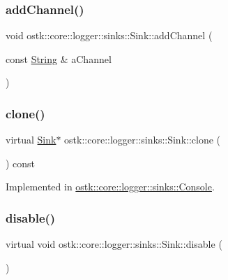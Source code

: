\subsubsection{\texorpdfstring{add\+Channel()}{addChannel()}}
{\footnotesize\ttfamily void ostk\+::core\+::logger\+::sinks\+::\+Sink\+::add\+Channel (\begin{DoxyParamCaption}\item[{const \hyperlink{classostk_1_1core_1_1types_1_1_string}{String} \&}]{a\+Channel }\end{DoxyParamCaption})}

\mbox{\label{classostk_1_1core_1_1logger_1_1sinks_1_1_sink_a0e6b41f9b4626b5229370f71bd27be32}} 
\subsubsection{\texorpdfstring{clone()}{clone()}}
{\footnotesize\ttfamily virtual \hyperlink{classostk_1_1core_1_1logger_1_1sinks_1_1_sink}{Sink}$\ast$ ostk\+::core\+::logger\+::sinks\+::\+Sink\+::clone (\begin{DoxyParamCaption}{ }\end{DoxyParamCaption}) const\hspace{0.3cm}{\ttfamily [pure virtual]}}



Implemented in \hyperlink{classostk_1_1core_1_1logger_1_1sinks_1_1_console_ab906fb3918a362c527489091e006d521}{ostk\+::core\+::logger\+::sinks\+::\+Console}.

\mbox{\label{classostk_1_1core_1_1logger_1_1sinks_1_1_sink_a3e347ffee80e3c2ee50ff0edf9265115}} 
\subsubsection{\texorpdfstring{disable()}{disable()}}
{\footnotesize\ttfamily virtual void ostk\+::core\+::logger\+::sinks\+::\+Sink\+::disable (\begin{DoxyParamCaption}{ }\end{DoxyParamCaption})\hspace{0.3cm}{\ttfamily [pure virtual]}}



